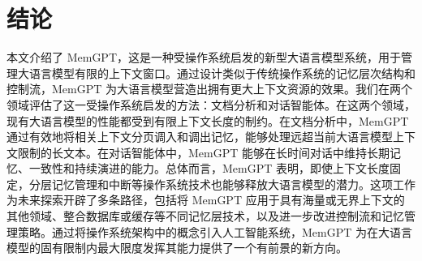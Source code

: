 \documentclass[UTF8,fontset=fandol,a4paper,11pt]{ctexart}
\newcommand{\ours}{MemGPT\xspace}
\begin{document}


\section{结论}
本文介绍了 \ours，这是一种受操作系统启发的新型大语言模型系统，用于管理大语言模型有限的上下文窗口。通过设计类似于传统操作系统的记忆层次结构和控制流，\ours 为大语言模型营造出拥有更大上下文资源的效果。我们在两个领域评估了这一受操作系统启发的方法：文档分析和对话智能体。在这两个领域，现有大语言模型的性能都受到有限上下文长度的制约。在文档分析中，\ours 通过有效地将相关上下文分页调入和调出记忆，能够处理远超当前大语言模型上下文限制的长文本。在对话智能体中，\ours 能够在长时间对话中维持长期记忆、一致性和持续演进的能力。总体而言，\ours 表明，即使上下文长度固定，分层记忆管理和中断等操作系统技术也能够释放大语言模型的潜力。这项工作为未来探索开辟了多条路径，包括将 \ours 应用于具有海量或无界上下文的其他领域、整合数据库或缓存等不同记忆层技术，以及进一步改进控制流和记忆管理策略。通过将操作系统架构中的概念引入人工智能系统，\ours 为在大语言模型的固有限制内最大限度发挥其能力提供了一个有前景的新方向。

\clearpage
\end{document}
